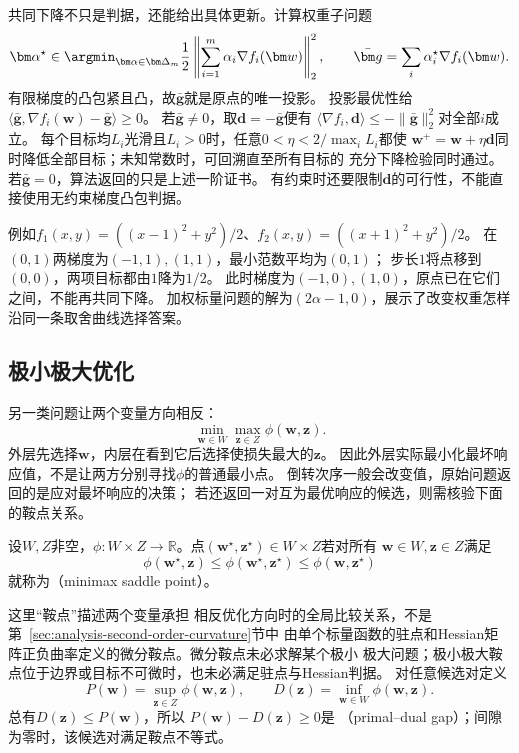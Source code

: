 共同下降不只是判据，还能给出具体更新。计算权重子问题
\[
 \bm\alpha^\star\in\argmin_{\bm\alpha\in\bm\Delta_m}
 \frac12\left\|\sum_{i=1}^m\alpha_i\nabla f_i(\bm w)\right\|_2^2,
 \qquad
 \bar{\bm g}=\sum_i\alpha_i^\star\nabla f_i(\bm w).
\]
有限梯度的凸包紧且凸，故$\bar{\bm g}$就是原点的唯一投影。
投影最优性给
$\langle\bar{\bm g},\nabla f_i(\bm w)-\bar{\bm g}\rangle\geq0$。
若$\bar{\bm g}\neq0$，取$\bm d=-\bar{\bm g}$便有
$\langle\nabla f_i,\bm d\rangle\leq-\|\bar{\bm g}\|_2^2$对全部$i$成立。
每个目标均$L_i$光滑且$L_i>0$时，任意$0<\eta<2/\max_i L_i$都使
$\bm w^+=\bm w+\eta\bm d$同时降低全部目标；未知常数时，可回溯直至所有目标的
充分下降检验同时通过。若$\bar{\bm g}=0$，算法返回的只是上述一阶证书。
有约束时还要限制$\bm d$的可行性，不能直接使用无约束梯度凸包判据。

例如$f_1(x,y)=((x-1)^2+y^2)/2$、$f_2(x,y)=((x+1)^2+y^2)/2$。
在$(0,1)$两梯度为$(-1,1),(1,1)$，最小范数平均为$(0,1)$；
步长$1$将点移到$(0,0)$，两项目标都由$1$降为$1/2$。
此时梯度为$(-1,0),(1,0)$，原点已在它们之间，不能再共同下降。
加权标量问题的解为$(2\alpha-1,0)$，展示了改变权重怎样沿同一条取舍曲线选择答案。

\subsection{极小极大优化}
\label{sec:opt-minimax}

另一类问题让两个变量方向相反：
\[
  \min_{\bm{w}\in W}\max_{\bm{z}\in Z}\phi(\bm{w},\bm{z}).
\]
外层先选择$\bm w$，内层在看到它后选择使损失最大的$\bm z$。
因此外层实际最小化最坏响应值，不是让两方分别寻找$\phi$的普通最小点。
倒转次序一般会改变值，原始问题返回的是应对最坏响应的决策；
若还返回一对互为最优响应的候选，则需核验下面的鞍点关系。
\begin{definition}[极小极大鞍点]
\label{def:opt-minimax-saddle}
设$W,Z$非空，$\phi:W\times Z\to\mathbb R$。点$(\bm w^\star,\bm z^\star)\in W\times Z$若对所有
$\bm w\in W,\bm z\in Z$满足
\[
  \phi(\bm{w}^{\star},\bm{z})
  \leq\phi(\bm{w}^{\star},\bm{z}^{\star})
  \leq\phi(\bm{w},\bm{z}^{\star})
\]
就称为（minimax saddle point）。
\end{definition}
这里“鞍点”描述两个变量承担
相反优化方向时的全局比较关系，不是第~\ref{sec:analysis-second-order-curvature}节中
由单个标量函数的驻点和Hessian矩阵正负曲率定义的微分鞍点。微分鞍点未必求解某个极小
极大问题；极小极大鞍点位于边界或目标不可微时，也未必满足驻点与Hessian判据。
对任意候选对定义
\[
  P(\bm{w})=\sup_{\bm{z}\in Z}\phi(\bm{w},\bm{z}),\qquad
  D(\bm{z})=\inf_{\bm{w}\in W}\phi(\bm{w},\bm{z}).
\]
总有$D(\bm{z})\leq P(\bm{w})$，所以
$P(\bm{w})-D(\bm{z})\geq0$是
（primal--dual gap）；间隙为零时，该候选对满足鞍点不等式。

